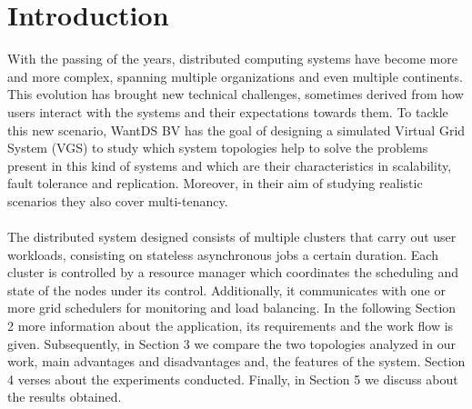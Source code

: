\section{Introduction}
With the passing of the years, distributed computing systems have become more and more complex, spanning multiple organizations and even multiple continents. This evolution has brought new technical challenges, sometimes derived from how users interact with the systems and their expectations towards them. To tackle this new scenario, WantDS BV has the goal of designing a simulated Virtual Grid System (VGS) to study which system topologies help to solve the problems present in this kind of systems and which are their characteristics in scalability, fault tolerance and replication. Moreover, in their aim of studying realistic scenarios they also cover multi-tenancy.
\\\\
The distributed system designed consists of multiple clusters that carry out user workloads, consisting on stateless asynchronous jobs a certain duration. Each cluster is controlled by a resource manager which coordinates the scheduling and state of the nodes under its control. Additionally, it communicates with one or more grid schedulers for monitoring and load balancing. In the following Section 2 more information about the application, its requirements and the work flow is given. Subsequently, in Section 3 we compare the two topologies analyzed in our work, main advantages and disadvantages and, the features of the system. Section 4 verses about the experiments conducted. Finally, in Section 5 we discuss about the results obtained.
